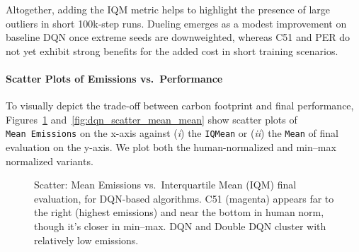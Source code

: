 Altogether, adding the IQM metric helps to highlight the presence of large outliers
in short 100k‐step runs. Dueling emerges as a modest improvement on baseline DQN
once extreme seeds are downweighted, whereas C51 and PER do not yet exhibit 
strong benefits for the added cost in short training scenarios.


\paragraph{Scatter Plots of Emissions vs.\ Performance}
To visually depict the trade-off between carbon footprint and final performance,
Figures~\ref{fig:dqn_scatter_mean_iqm} and~\ref{fig:dqn_scatter_mean_mean} 
show scatter plots of \texttt{Mean~Emissions} on the x-axis against 
(\emph{i}) the \texttt{IQMean} or 
(\emph{ii}) the \texttt{Mean} of final evaluation on the y-axis. 
We plot both the human-normalized and min--max normalized variants.

\begin{figure}
	\centering
	\quad
	\caption{Scatter: Mean Emissions vs.\ Interquartile Mean (IQM) final evaluation, for DQN-based algorithms. 
		C51 (magenta) appears far to the right (highest emissions) 
		and near the bottom in human norm, though it’s closer in min--max. 
		DQN and Double DQN cluster with relatively low emissions.}
	\label{fig:dqn_scatter_mean_iqm}
\end{figure}

